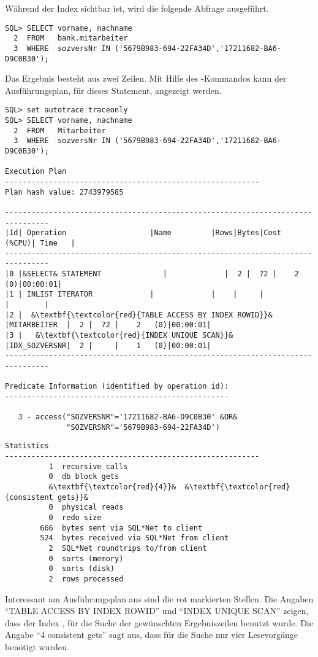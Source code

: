           Während der Index  sichtbar ist, wird die folgende Abfrage ausgeführt.
          \begin{lstlisting}[caption={Abfrage mit sichtbarem Index},label=admin326,language=oracle_sql]
SQL> SELECT vorname, nachname
  2  FROM   bank.mitarbeiter
  3  WHERE  sozversNr IN ('5679B983-694-22FA34D','17211682-BA6-D9C0B30');
          \end{lstlisting}
          Das Ergebnis besteht aus zwei Zeilen. Mit Hilfe des -Kommandos kann der Ausführungsplan, für dieses Statement, angezeigt werden.
          \begin{lstlisting}[caption={Ausfürungsplan für die Abfrage mit sichtbarem Index},label=admin327,language=oracle_sql,alsolanguage=sqlplus]
SQL> set autotrace traceonly
SQL> SELECT vorname, nachname
  2  FROM   Mitarbeiter
  3  WHERE  sozversNr IN ('5679B983-694-22FA34D','17211682-BA6-D9C0B30');

Execution Plan
----------------------------------------------------------
Plan hash value: 2743979585

--------------------------------------------------------------------------------
|Id| Operation                   |Name         |Rows|Bytes|Cost (%CPU)| Time   |
--------------------------------------------------------------------------------
|0 |&SELECT& STATEMENT              |             |  2 |  72 |    2   (0)|00:00:01|
|1 | INLIST ITERATOR             |             |    |     |           |        |
|2 |  &\textbf{\textcolor{red}{TABLE ACCESS BY INDEX ROWID}}&     |MITARBEITER  |  2 |  72 |    2   (0)|00:00:01|
|3 |   &\textbf{\textcolor{red}{INDEX UNIQUE SCAN}}&            |IDX_SOZVERSNR|  2 |     |    1   (0)|00:00:01|
--------------------------------------------------------------------------------

Predicate Information (identified by operation id):
---------------------------------------------------

   3 - access("SOZVERSNR"='17211682-BA6-D9C0B30' &OR&
              "SOZVERSNR"='5679B983-694-22FA34D')
          \end{lstlisting}
\clearpage
          \begin{lstlisting}[caption={Und so wird er wieder sichtbar -
          Fortsetzung},language=terminal]
Statistics
----------------------------------------------------------
          1  recursive calls
          0  db block gets
          &\textbf{\textcolor{red}{4}}&  &\textbf{\textcolor{red}{consistent gets}}&
          0  physical reads
          0  redo size
        666  bytes sent via SQL*Net to client
        524  bytes received via SQL*Net from client
          2  SQL*Net roundtrips to/from client
          0  sorts (memory)
          0  sorts (disk)
          2  rows processed
          \end{lstlisting}
          Interessant am Ausführungsplan aus  sind die rot markierten Stellen. Die Angaben \enquote{TABLE ACCESS BY INDEX ROWID} und \enquote{INDEX UNIQUE SCAN} zeigen, dass der Index , für die Suche der gewünschten Ergebniszeilen benutzt wurde. Die Angabe \enquote{4 consistent gets} sagt aus, dass für die Suche nur vier Lesevorgänge benötigt wurden.

